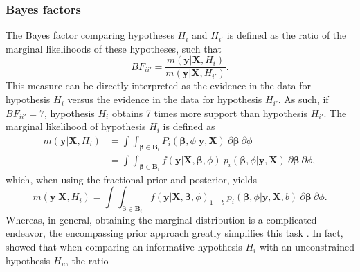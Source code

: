 \documentclass[
]{article}
\begin{document}
\hypertarget{bayes-factors}{%
\subsubsection{Bayes factors}\label{bayes-factors}}

The Bayes factor comparing hypotheses \(H_i\) and \(H_{i'}\) is defined
as the ratio of the marginal likelihoods of these hypotheses, such that
\[
BF_{ii'} = \frac{m(\boldsymbol{y} | \boldsymbol{X}, H_i)}{m(\boldsymbol{y} | \boldsymbol{X}, H_{i'})}.
\] This measure can be directly interpreted as the evidence in the data
for hypothesis \(H_i\) versus the evidence in the data for hypothesis
\(H_{i'}\). As such, if \(BF_{ii'} = 7\), hypothesis \(H_i\) obtains 7
times more support than hypothesis \(H_{i'}\). The marginal likelihood
of hypothesis \(H_i\) is defined as \[
\begin{aligned}
m(\boldsymbol{y} | \boldsymbol{X}, H_i) 
&= \int \int_{\boldsymbol{\beta} \in \boldsymbol{B}_i}  P_i(\boldsymbol{\beta}, \phi | \boldsymbol{y}, \boldsymbol{X}) ~ \partial \boldsymbol{\beta} ~ \partial \phi \\
&= \int \int_{\boldsymbol{\beta} \in \boldsymbol{B}_i} f(\boldsymbol{y} | \boldsymbol{X}, \boldsymbol{\beta}, \phi) ~ p_i(\boldsymbol{\beta}, \phi | \boldsymbol{y}, \boldsymbol{X}) ~ \partial \boldsymbol{\beta} ~ \partial \phi,
\end{aligned}
\] which, when using the fractional prior and posterior, yields \[
m(\boldsymbol{y} | \boldsymbol{X}, H_i) = 
  \int \int_{\boldsymbol{\beta} \in \boldsymbol{B}_i}  
  f(\boldsymbol{y} | \boldsymbol{X}, \boldsymbol{\beta}, \phi)_{1-b} ~ 
  p_i(\boldsymbol{\beta}, \phi | \boldsymbol{y}, \boldsymbol{X}, b) ~ \partial \boldsymbol{\beta} ~ \partial \phi.
\] Whereas, in general, obtaining the marginal distribution is a
complicated endeavor, the encompassing prior approach greatly simplifies
this task \citep{klugkist_inequality_2005}. In fact,
\citet{gu_approximated_2018} showed that when comparing an informative
hypothesis \(H_i\) with an unconstrained hypothesis \(H_u\), the ratio
\end{document}
